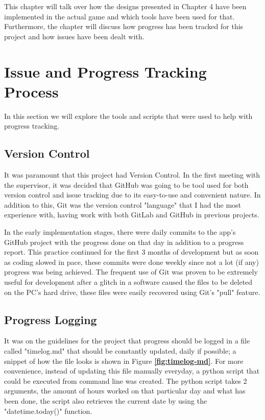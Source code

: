 \documentclass{dissertation}
\begin{document}
This chapter will talk over how the designs presented in Chapter 4 have been implemented in the actual game and which tools have been used for that. Furthermore, the chapter will discuss how progress has been tracked for this project and how issues have been dealt with.

\section{Issue and Progress Tracking Process}

In this section we will explore the tools and scripts that were used to help with progress tracking.

\subsection{Version Control}
It was paramount that this project had Version Control. In the first meeting with the supervisor, it was decided that GitHub was going to be tool used for both version control and issue tracking due to its easy-to-use and convenient nature. In addition to this, Git was the version control "language" that I had the most experience with, having work with both GitLab and GitHub in previous projects. 

In the early implementation stages, there were daily commits to the app's GitHub project with the progress done on that day in addition to a progress report. This practice continued for the first 3 months of development but as soon as coding slowed in pace, these commits were done weekly since not a lot (if any) progress was being achieved. The frequent use of Git was proven to be extremely useful for development after a glitch in a software caused the files to be deleted on the PC's hard drive, these files were easily recovered using Git's "pull" feature.

\subsection{Progress Logging}
It was on the guidelines for the project that progress should be logged in a file called "timelog.md" that should be constantly updated, daily if possible; a snippet of how the file looks is shown in Figure \textbf{\ref{fig:timelog-md}}. For more convenience, instead of updating this file manually everyday, a python script that could be executed from command line was created. The python script takes 2 arguments, the amount of hours worked on that particular day and what has been done, the script also retrieves the current date by using the "datetime.today()" function.
\end{document}
